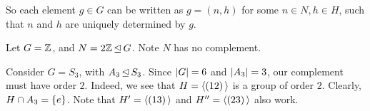So each element $ g \in G $ can be written as $ g = (n, h) $ for some $ n \in N, h \in H $,
such that $ n $ and $ h $ are uniquely determined by $ g $.

\begin{xmp}[source=Primary Source Material]
    Let $ G = \mathbb{Z} $, and $ N = 2\mathbb{Z} \operatorname{\trianglelefteq} G $. Note $ N $ has no complement.
\end{xmp}

\begin{xmp}[source=Primary Source Material]
    Consider $ G = S_{3} $, with $ A_{3} \operatorname{\trianglelefteq} S_{3} $.
    Since $ \abs{G} = 6 $ and $ \abs{A_{3}} = 3 $, our complement must have order $ 2 $. \vsp
    Indeed, we see that $ H = \operatorname{\langle} (12) \operatorname{\rangle} $ is a group of order $ 2 $.
    Clearly, $ H \cap A_{3} = \left\{{e}\right\} $.
    Note that $ H' = \operatorname{\langle} (13) \operatorname{\rangle} $ and $ H'' = \operatorname{\langle} (23) \operatorname{\rangle} $ also work.
\end{xmp}
